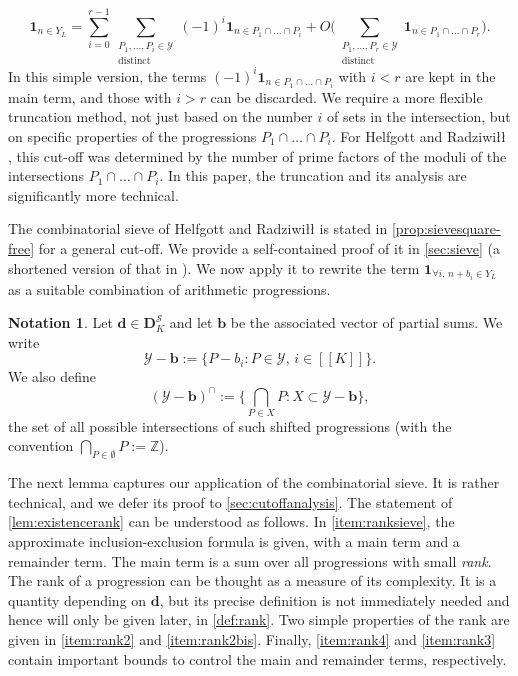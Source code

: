 \documentclass[11pt]{amsart}
\theoremstyle{definition}
\newtheorem{notation}[theorem]{Notation}
\newcommand{\sinterval}[1]{[\![#1]\!] }
\newcommand{\ind}[1]{\mathbf{1}_{#1}}
\newcommand{\Z}{\mathbb{Z}}
\renewcommand{\d}{\boldsymbol{d}}
\newcommand{\sommespart}{b}
\newcommand{\s}{\mathcal{S}}
\newcommand{\fancyD}{\mathbf{D}}
\newcommand{\Ds}{\fancyD^{\s}_{\!\repK}}
\newcommand{\elln}{L}
\newcommand{\Y}{Y_{\!\elln}}
\renewcommand{\vec}{\boldsymbol}
\newcommand{\prohibprog}{\mathcal{Y}}
\newcommand{\repK}{K}
\newcommand{\newK}{\sinterval{K}}
\newcommand{\shiftedprog}{\prohibprog-\vec{\sommespart}}
\newcommand{\interprog}{(\shiftedprog)^{\cap}}
\begin{document}
\begin{itemize}
\begin{equation*}
	\ind{n\in \Y} = \sum_{i=0}^{r-1} \sum_{\substack{P_1, \ldots, P_i \in \prohibprog\\ \text{distinct}}} (-1)^{i} \ind{n\in P_1\cap \ldots \cap P_i} + O\Bigg(\sum_{\substack{P_1, \ldots, P_r \in \prohibprog\\ \text{distinct}}} \ind{n\in P_1\cap \ldots \cap P_r}\Bigg).
\end{equation*} 
In this simple version, the terms $(-1)^{i} \ind{n\in P_1\cap \ldots \cap P_i}$ with $i<r$ are kept in the main term, and those with $i>r$ can be discarded. We require a more flexible truncation method, not just based on the number $i$ of sets in the intersection, but on specific properties of the progressions $P_1\cap \ldots \cap P_i$. For Helfgott and Radziwiłł \cite{HR}, this cut-off was determined by the number of prime factors of the moduli of the intersections $P_1\cap \ldots \cap P_i$. In this paper, the truncation and its analysis are significantly more technical.
\end{itemize}

The combinatorial sieve of Helfgott and Radziwiłł is stated in \cref{prop:sievesquare-free} for a general cut-off. We provide a self-contained proof of it in \cref{sec:sieve} (a shortened version of that in \cite{HR}). We now apply it to rewrite the term $\ind{\forall i,\,n+\sommespart_i \in \Y}$ as a suitable combination of arithmetic progressions.

\begin{notation}
\label{def:Qintersect}
Let $\d \in \Ds$ and let $\vec{\sommespart}$ be the associated vector of partial sums. We write 
\begin{equation*}
{\shiftedprog := \{P-\sommespart_i : P \in \prohibprog, \,i\in \newK\}}.
\end{equation*}
We also define 
\begin{equation*}
\interprog := \bigg\{\bigcap_{P\in X}P : X \subset \shiftedprog\bigg\},
\end{equation*}
the set of all possible intersections of such shifted progressions (with the convention $\bigcap_{P\in \emptyset}P := \Z$).
\end{notation}

The next lemma captures our application of the combinatorial sieve. It is rather technical, and we defer its proof to \cref{sec:cutoffanalysis}. The statement of \cref{lem:existencerank} can be understood as follows. In \cref{item:ranksieve}, the approximate inclusion-exclusion formula is given, with a main term and a remainder term. The main term is a sum over all progressions with small \emph{rank}. The rank of a progression can be thought as a measure of its complexity. It is a quantity depending on $\d$, but its precise definition is not immediately needed and hence will only be given later, in \cref{def:rank}. Two simple properties of the rank are given in \cref{item:rank2} and \cref{item:rank2bis}. Finally, \cref{item:rank4} and \cref{item:rank3} contain important bounds to control the main and remainder terms, respectively.
\end{document}
